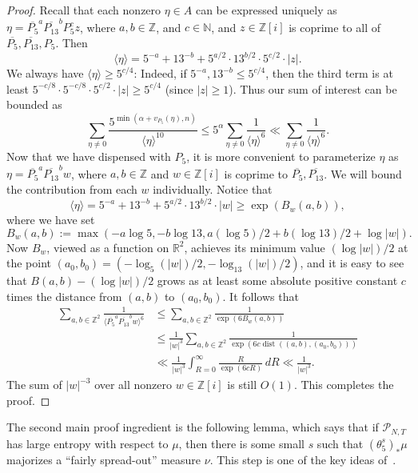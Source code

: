 \documentclass[11pt]{amsart}
\theoremstyle{definition}
\DeclareMathOperator{\dist}{dist}
\begin{document}
\begin{proof}
Recall that each nonzero $\eta \in A$ can be expressed uniquely as $\eta=\overline{P_5}^a \overline{P_{13}}^b P_5^c z$, where $a,b \in \mathbb{Z}$, and $c \in \mathbb{N}$, and $z \in \mathbb{Z}[i]$ is coprime to all of $\overline{P_5},\overline{P_{13}},P_5$.  Then
$$\langle \eta \rangle=5^{-a}+13^{-b}+5^{a/2} \cdot 13^{b/2} \cdot 5^{c/2} \cdot |z|.$$
We always have $\langle \eta \rangle \geq 5^{c/4}$: Indeed, if $5^{-a},13^{-b}\leq 5^{c/4}$, then the third term is at least $5^{-c/8} \cdot 5^{-c/8} \cdot 5^{c/2} \cdot |z| \geq 5^{c/4}$ (since $|z| \geq 1$).  Thus our sum of interest can be bounded as
$$\sum_{\eta \neq 0} \frac{5^{\min(\alpha+v_{P_5}(\eta),n)}}{\langle \eta \rangle^{10}} \leq 5^\alpha \sum_{\eta \neq 0} \frac{1}{\langle \eta \rangle^{6}} \ll \sum_{\eta \neq 0} \frac{1}{\langle \eta \rangle^{6}}.$$
Now that we have dispensed with $P_5$, it is more convenient to parameterize $\eta$ as $\eta=\overline{P_5}^a \overline{P_{13}}^b w$, where $a,b \in \mathbb{Z}$ and $w \in \mathbb{Z}[i]$ is coprime to $\overline{P_5}, \overline{P_{13}}$.  We will bound the contribution from each $w$ individually.  Notice that $$\langle \eta \rangle=5^{-a}+13^{-b}+5^{a/2} \cdot 13^{b/2} \cdot |w|\geq \exp(B_w(a,b)),$$ where we have set
$$B_w(a,b):=\max(-a\log 5,-b\log 13,a(\log 5)/2+b(\log 13)/2+\log|w|).$$
Now $B_w$, viewed as a function on $\mathbb{R}^2$, achieves its minimum value $(\log|w|)/2$ at the point $(a_0,b_0)=(-\log_5(|w|)/2,-\log_{13}(|w|)/2)$, and it is easy to see that $B(a,b)-(\log|w|)/2$ grows as at least some absolute positive constant $c$ times the distance from $(a,b)$ to $(a_0,b_0)$.  It follows that
\begin{align*}
\sum_{a,b \in \mathbb{Z}^2} \frac{1}{\langle \overline{P_5}^a \overline{P_{13}}^b w \rangle^6} &\leq \sum_{a,b \in \mathbb{Z}^2} \frac{1}{\exp(6B_w(a,b))}\\
 &\leq \frac{1}{|w|^3} \sum_{a,b \in \mathbb{Z}^2}\frac{1}{\exp(6c \dist((a,b),(a_0,b_0)))}\\
 &\ll \frac{1}{|w|^3} \int_{R=0}^\infty \frac{R}{\exp(6cR)} \,dR \ll \frac{1}{|w|^3}.
\end{align*}
The sum of $|w|^{-3}$ over all nonzero $w \in \mathbb{Z}[i]$ is still $O(1)$. This completes the proof.
\end{proof}

The second main proof ingredient is the following lemma, which says that if $\mathcal{P}_{N,T}$ has large entropy with respect to $\mu$, then there is some small $s$ such that $(\theta_5^s)_* \mu$ majorizes a ``fairly spread-out'' measure $\nu$.  This step is one of the key ideas of~\cite{BLMV08}.
\end{document}
